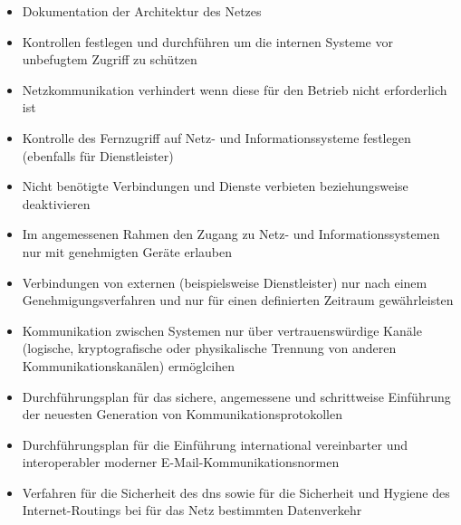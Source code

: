 \documentclass[11pt,a4paper,hidelinks]{article}   %
\begin{document}
                \begin{itemize}
                    \item Dokumentation der Architektur des Netzes
                    \item Kontrollen festlegen und durchführen um die internen Systeme vor unbefugtem Zugriff zu schützen
                    \item Netzkommunikation verhindert wenn diese für den Betrieb nicht erforderlich ist
                    \item Kontrolle des Fernzugriff auf Netz- und Informationssysteme festlegen (ebenfalls für Dienstleister)
                    \item Nicht benötigte Verbindungen und Dienste verbieten beziehungsweise deaktivieren
                    \item Im angemessenen Rahmen den Zugang zu Netz- und Informationssystemen nur mit genehmigten Geräte erlauben
                    \item Verbindungen von externen (beispielsweise Dienstleister) nur nach einem Genehmigungsverfahren und nur für einen definierten Zeitraum gewährleisten
                    \item Kommunikation zwischen Systemen nur über vertrauenswürdige Kanäle (logische, kryptografische oder physikalische Trennung von anderen Kommunikationskanälen) ermöglcihen
                    \item Durchführungsplan für das sichere, angemessene und schrittweise Einführung der neuesten Generation von Kommunikationsprotokollen
                    \item Durchführungsplan für die Einführung international vereinbarter und interoperabler moderner E-Mail-Kommunikationsnormen
                    \item Verfahren für die Sicherheit des \gls{dns} sowie für die Sicherheit und Hygiene des Internet-Routings bei für das Netz bestimmten Datenverkehr

\end{itemize}
\end{document}
